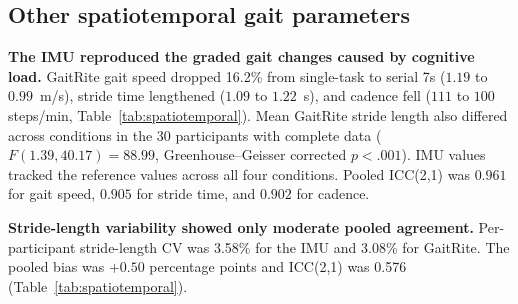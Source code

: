 \documentclass[11pt]{article}
\begin{document}
\FloatBarrier
\subsection{Other spatiotemporal gait parameters}

\textbf{The IMU reproduced the graded gait changes caused by cognitive load.} GaitRite gait speed dropped 16.2\% from single-task to serial 7s ($1.19$ to $0.99$~m/s), stride time lengthened ($1.09$ to $1.22$~s), and cadence fell ($111$ to $100$ steps/min, Table~\ref{tab:spatiotemporal}). Mean GaitRite stride length also differed across conditions in the 30 participants with complete data ($F(1.39, 40.17) = 88.99$, Greenhouse--Geisser corrected $p < .001$). IMU values tracked the reference values across all four conditions. Pooled ICC(2,1) was $0.961$ for gait speed, $0.905$ for stride time, and $0.902$ for cadence.

\textbf{Stride-length variability showed only moderate pooled agreement.} Per-participant stride-length CV was 3.58\% for the IMU and 3.08\% for GaitRite. The pooled bias was $+0.50$ percentage points and ICC(2,1) was 0.576 (Table~\ref{tab:spatiotemporal}).
\end{document}
